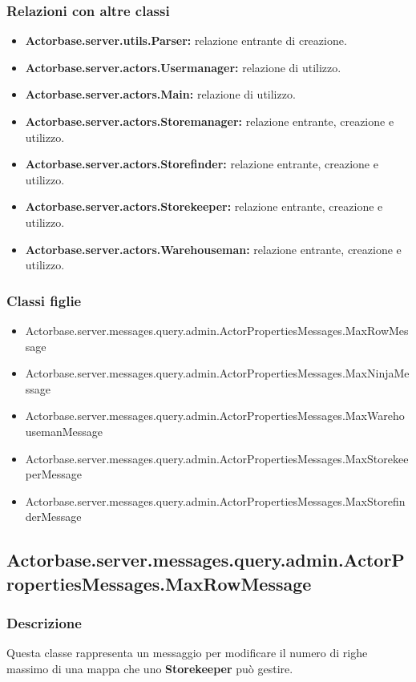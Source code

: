 \documentclass[a4paper]{article}
\begin{document}
			\subsubsection{Relazioni con altre classi}
				\begin{itemize}
					\item \textbf{Actorbase.server.utils.Parser:} relazione entrante di creazione.
					\item \textbf{Actorbase.server.actors.Usermanager:} relazione di utilizzo.
					\item \textbf{Actorbase.server.actors.Main:} relazione di utilizzo.
					\item \textbf{Actorbase.server.actors.Storemanager:} relazione entrante, creazione e utilizzo.
					\item \textbf{Actorbase.server.actors.Storefinder:} relazione entrante, creazione e utilizzo.
					\item \textbf{Actorbase.server.actors.Storekeeper:} relazione entrante, creazione e utilizzo.
					\item \textbf{Actorbase.server.actors.Warehouseman:} relazione entrante, creazione e utilizzo.
				\end{itemize}
			\subsubsection{Classi figlie}
				\begin{itemize}
					\item Actorbase.server.messages.query.admin.ActorPropertiesMessages.MaxRowMessage
					\item Actorbase.server.messages.query.admin.ActorPropertiesMessages.MaxNinjaMessage
					\item Actorbase.server.messages.query.admin.ActorPropertiesMessages.MaxWarehousemanMessage
					\item Actorbase.server.messages.query.admin.ActorPropertiesMessages.MaxStorekeeperMessage
					\item Actorbase.server.messages.query.admin.ActorPropertiesMessages.MaxStorefinderMessage
				\end{itemize}

		\subsection{Actorbase.server.messages.query.admin.ActorPropertiesMessages.MaxRowMessage}
		
			\subsubsection{Descrizione}
				Questa classe rappresenta un messaggio per modificare il numero di righe massimo di una mappa che uno \textbf{Storekeeper} può gestire.
				
\end{document}
